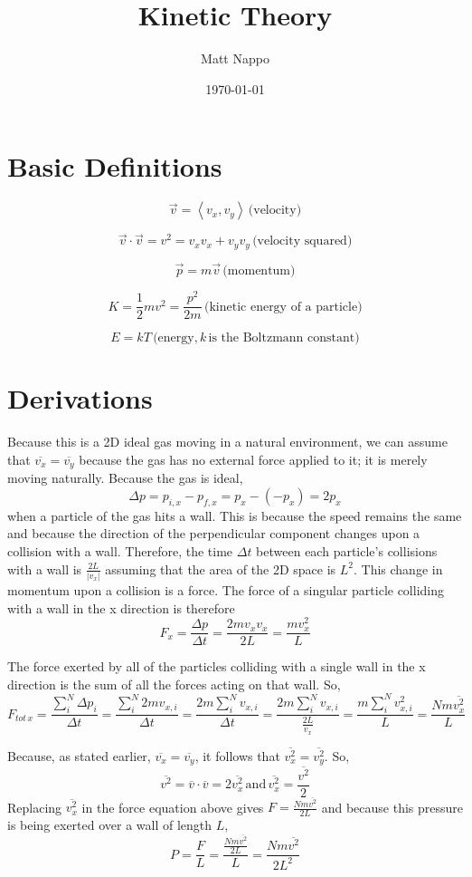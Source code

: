 \documentclass{article}
\title{Kinetic Theory}
\author{Matt Nappo}
\date{\today}
\begin{document}
\maketitle

\section{Basic Definitions}
$$\vec{v} = \left< v_x, v_y \right> \,\text{(velocity)}$$

$$\vec{v} \cdot \vec{v} = v^2 = v_xv_x + v_yv_y \,\text{(velocity squared)}$$

$$\vec{p} = m\vec{v} \,\text{(momentum)}$$

$$K = \frac{1}{2}mv^2 = \frac{p^2}{2m} \,\text{(kinetic energy of a particle)}$$

$$ E = kT\,\text{(energy,}\, k\, \text{is the Boltzmann constant)}$$


\section{Derivations}
Because this is a 2D ideal gas moving in a natural environment, we can assume that $\overline{v_x} = \overline{v_y}$ because the gas has no external force applied to it; it is merely moving naturally.
Because the gas is ideal, $$\Delta p = p_{i,x} - p_{f,x} = p_x - (-p_x) = 2p_x$$ when a particle of the gas hits a wall. This is because the speed remains the same and because the direction of the perpendicular component changes upon a collision with a wall.  Therefore, the time $\Delta t$ between each particle's collisions with a wall is $\frac{2L}{|v_x|}$ assuming that the area of the 2D space is $L^2$.
This change in momentum upon a collision is a force. The force of a singular particle colliding with a wall in the x direction is therefore
$$F_x = \frac{\Delta p}{\Delta t} = \frac{2mv_xv_x}{2L} = \frac{mv_x^2}{L}$$

The force exerted by all of the particles colliding with a single wall in the x direction is the sum of all the forces acting on that wall. So,
$$F_{tot\,x} = \frac{\sum_i^N \Delta p_i}{\Delta t} = \frac{\sum_i^N 2mv_{x,i}}{\Delta t} = \frac{2m \sum_i^N v_{x,i}}{\Delta t} = \frac{2m \sum_i^N v_{x,i}}{\frac{2L}{v_x}} = \frac{m \sum_i^N v_{x,i}^2}{L} = \frac{Nm\overline{v_x^2}}{L}$$

Because, as stated earlier, $\overline{v_x} = \overline{v_y}$, it follows that $\overline{v_x^2} = \overline{v_y^2}$. So, $$\overline{v^2} = \overline v \cdot \overline v = 2\overline{v_x^2}\,\text{and}\, \overline{v_x^2} = \frac{\overline{v^2}}{2}$$
Replacing $\overline{v_x^2}$ in the force equation above gives $F = \frac{Nm\overline{v^2}}{2L}$ and because this pressure is being exerted over a wall of length $L$,
$$P = \frac{F}{L} = \frac{\frac{Nm\overline{v^2}}{2L}}{L} = \frac{Nm\overline{v^2}}{2L^2}$$
\end{document}
